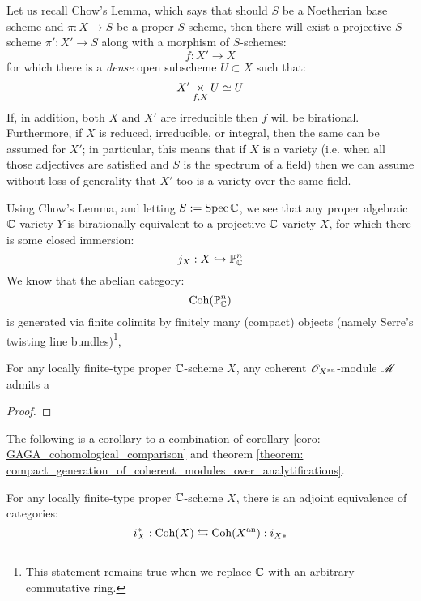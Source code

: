         \begin{remark}
            Let us recall Chow's Lemma, which says that should $S$ be a Noetherian base scheme and $\pi: X \to S$ be a proper $S$-scheme, then there will exist a projective $S$-scheme $\pi': X' \to S$ along with a morphism of $S$-schemes:
                $$f: X' \to X$$
            for which there is a \textit{dense} open subscheme $U \subset X$ such that:
                $$X' \x_{f, X} U \cong U$$
            If, in addition, both $X$ and $X'$ are irreducible then $f$ will be birational. Furthermore, if $X$ is reduced, irreducible, or integral, then the same can be assumed for $X'$; in particular, this means that if $X$ is a variety (i.e. when all those adjectives are satisfied and $S$ is the spectrum of a field) then we can assume without loss of generality that $X'$ too is a variety over the same field.

            Using Chow's Lemma, and letting $S := \operatorname{Spec} \mathbb{C}$, we see that any proper algebraic $\mathbb{C}$-variety $Y$ is birationally equivalent to a projective $\mathbb{C}$-variety $X$, for which there is some closed immersion:
                $$j_X: X \hookrightarrow \mathbb{P}^n_{\mathbb{C}}$$
            We know that the abelian category:
                $$\mathrm{Coh}(\mathbb{P}^n_{\mathbb{C}})$$
            is generated via finite colimits by finitely many (compact) objects (namely Serre's twisting line bundles)\footnote{This statement remains true when we replace $\mathbb{C}$ with an arbitrary commutative ring.}, 
        \end{remark}

        \begin{theorem} \label{theorem: compact_generation_of_coherent_modules_over_analytifications}
            For any locally finite-type proper $\mathbb{C}$-scheme $X$, any coherent $\mathscr{O}_{X^{\mathrm{an}}}$-module $\mathscr{M}$ admits a 
        \end{theorem}
            \begin{proof}
                
            \end{proof}
        The following is a corollary to a combination of corollary \ref{coro: GAGA_cohomological_comparison} and theorem \ref{theorem: compact_generation_of_coherent_modules_over_analytifications}.
        \begin{corollary}
            For any locally finite-type proper $\mathbb{C}$-scheme $X$, there is an adjoint equivalence of categories:
                $$i_X^*: \mathrm{Coh}(X) \leftrightarrows \mathrm{Coh}(X^{\mathrm{an}}): i_{X *}$$
        \end{corollary}